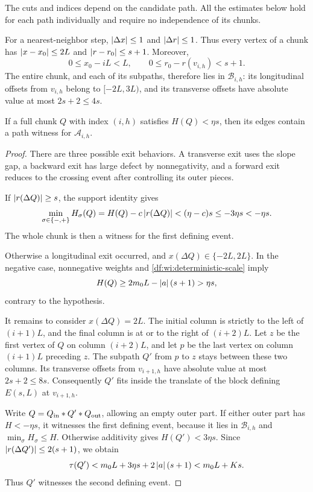 The cuts and indices depend on the candidate path. All the estimates
below hold for each path individually and require no independence of its
chunks.

For a nearest-neighbor step, $\left\lvert\Delta x\right\rvert\le1$ and
$\left\lvert\Delta r\right\rvert\le1$.  Thus every vertex of a chunk has
$\left\lvert x-x_0\right\rvert\le2L$ and $\left\lvert r-r_0\right\rvert\le s+1$.  Moreover,
\[
  0\le x_0-iL<L,
  \qquad
  0\le r_0-r(v_{i,h})<s+1.
\]
The entire chunk, and each of its subpaths, therefore lies in
$\mathcal B_{i,h}$: its longitudinal offsets from $v_{i,h}$ belong to
$[-2L,3L)$, and its transverse offsets have absolute value at most
$2s+2\le4s$.

\begin{lemma}
\label{df:wi:chunk-witness}
If a full chunk $Q$ with index $(i,h)$ satisfies $H(Q)<\eta s$, then its
edges contain a path witness for $\mathcal A_{i,h}$.
\end{lemma}

\begin{proof}
There are three possible exit behaviors. A transverse exit uses the slope
gap, a backward exit has large defect by nonnegativity, and a forward exit
reduces to the crossing event after controlling its outer pieces.

If $\left\lvert r(\Delta Q)\right\rvert\ge s$, the support identity gives
\[
  \min_{\sigma\in\{-,+\}}H_\sigma(Q)
  =H(Q)-c\left\lvert r(\Delta Q)\right\rvert
  <(\eta-c)s\le-3\eta s<-\eta s.
\]
The whole chunk is then a witness for the first defining event.

Otherwise a longitudinal exit occurred, and
$x(\Delta Q)\in\{-2L,2L\}$.  In the negative case, nonnegative weights
and \eqref{df:wi:deterministic-scale} imply
\[
  H(Q)\ge2m_0L-\left\lvert a\right\rvert(s+1)>\eta s,
\]
contrary to the hypothesis.

It remains to consider $x(\Delta Q)=2L$.  The initial column is strictly
to the left of $(i+1)L$, and the final column is at or to the right of
$(i+2)L$.  Let $z$ be the first vertex of $Q$ on column $(i+2)L$, and let
$p$ be the last vertex on column $(i+1)L$ preceding $z$.  The subpath
$Q'$ from $p$ to $z$ stays between these two columns.  Its transverse
offsets from $v_{i+1,h}$ have absolute value at most $2s+2\le8s$.
Consequently $Q'$ fits inside the translate of the block defining
$E(s,L)$ at $v_{i+1,h}$.

Write $Q=Q_{\rm in}*Q'*Q_{\rm out}$, allowing an empty outer part.
If either outer part has $H<-\eta s$, it witnesses the first defining
event, because it lies in $\mathcal B_{i,h}$ and
$\min_\sigma H_\sigma\le H$.  Otherwise additivity gives
$H(Q')<3\eta s$.  Since
$\left\lvert r(\Delta Q')\right\rvert\le2(s+1)$, we obtain
\[
  \tau(Q')
  <m_0L+3\eta s+2\left\lvert a\right\rvert(s+1)
  <m_0L+Ks.
\]
Thus $Q'$ witnesses the second defining event.
\end{proof}

